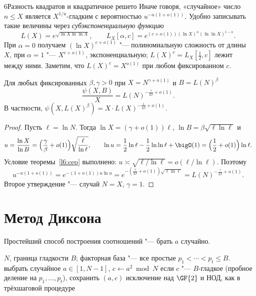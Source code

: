 \begin{lecture}{6}{Разность квадратов и квадратичное решето}
Иначе говоря, «случайное» число $n \le X$ является $X^{1/u}$-гладким с вероятностью
$u^{-u(1+o(1))}$. Удобно записывать такие величины через \emph{субэкспоненциальную функцию}
\[
  L(X) = e^{\sqrt{\ln X \ln\ln X}}, \qquad
  L_X[\alpha, c] = e^{(c + o(1)) (\ln X)^{\alpha} (\ln\ln X)^{1 - \alpha}}.
\]
При $\alpha = 0$ получаем $(\ln X)^{c + o(1)}$ "--- полиномиальную сложность от длины $X$, при
$\alpha = 1$ "--- $X^{c + o(1)}$, экспоненциальную; $L(X)^c = L_X[\frac12, c]$ лежит между ними.
Заметим, что $L(X)^c = X^{o(1)}$ при любом фиксированном $c$.

\begin{corollary}\label{l6:psiL}
Для любых фиксированных $\beta, \gamma > 0$ при $X = N^{\gamma + o(1)}$ и $B = L(N)^{\beta}$
\[
  \frac{\psi(X, B)}{X} = L(N)^{-\frac{\gamma}{2\beta} + o(1)}.
\]
В частности, $\psi(X, L(X)^{\beta}) = X \cdot L(X)^{-\frac{1}{2\beta} + o(1)}$.
\end{corollary}

\begin{proof}
Пусть $\ell = \ln N$. Тогда $\ln X = (\gamma + o(1))\ell$, $\ln B = \beta\sqrt{\ell \ln \ell}$ и
\[
  u = \frac{\ln X}{\ln B} = \Bigl(\frac{\gamma}{\beta} + o(1)\Bigr)\sqrt{\frac{\ell}{\ln\ell}}, \qquad
  \ln u = \frac12 \ln\ell - \frac12\ln\ln\ell + \bigO(1) = \Bigl(\frac12 + o(1)\Bigr)\ln \ell.
\]
Условие теоремы~\ref{l6:cep} выполнено: $u \asymp \sqrt{\ell / \ln \ell} = o(\ell/\ln\ell)$.
Поэтому
\[
  u^{-u(1 + o(1))} = e^{-(1 + o(1)) u \ln u}
  = e^{-\left(\frac{\gamma}{2\beta} + o(1)\right)\sqrt{\ell \ln\ell}} = L(N)^{-\frac{\gamma}{2\beta} + o(1)}.
\]
Второе утверждение "--- случай $N = X$, $\gamma = 1$.
\end{proof}


\section{Метод Диксона}

Простейший способ построения соотношений "--- брать $a$ случайно.

\begin{algorithm}[Диксон]\label{l6:dixon-alg}
\begin{algorithmic}[1]
\Require $N$, граница гладкости $B$; факторная база "--- все простые $p_1 < \cdots < p_t \le B$.
  \State выбрать случайное $a \in [1, N - 1]$, $c \gets a^2 \bmod N$
  \State если $c$ "--- $B$-гладкое (пробное деление на $p_1, \dots, p_t$), сохранить $(a, c)$
\EndWhile
\State исключение над $\GF{2}$ и НОД, как в трёхшаговой процедуре
\end{algorithmic}
\end{algorithm}


\end{lecture}

